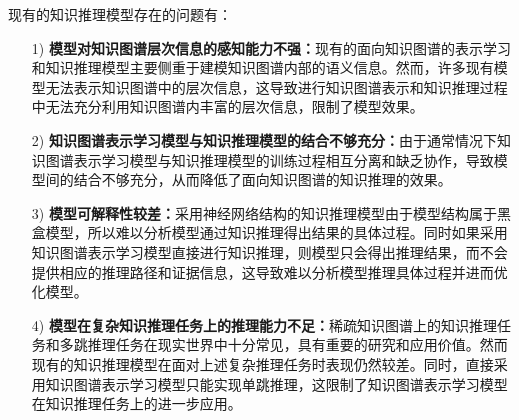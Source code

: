 \documentclass[algorithmlist, AutoFakeBold, AutoFakeSlant, figurelist, tablelist, nomlist, engineering]{seuthesix}
\begin{document}
现有的知识推理模型存在的问题有：
\begin{itemize}
  \item [1)]\textbf{模型对知识图谱层次信息的感知能力不强：}现有的面向知识图谱的表示学习和知识推理模型主要侧重于建模知识图谱内部的语义信息。然而，许多现有模型无法表示知识图谱中的层次信息，这导致进行知识图谱表示和知识推理过程中无法充分利用知识图谱内丰富的层次信息，限制了模型效果。
  \item [2)]\textbf{知识图谱表示学习模型与知识推理模型的结合不够充分：}由于通常情况下知识图谱表示学习模型与知识推理模型的训练过程相互分离和缺乏协作，导致模型间的结合不够充分，从而降低了面向知识图谱的知识推理的效果。
  \item [3)]\textbf{模型可解释性较差：}采用神经网络结构的知识推理模型由于模型结构属于黑盒模型，所以难以分析模型通过知识推理得出结果的具体过程。同时如果采用知识图谱表示学习模型直接进行知识推理，则模型只会得出推理结果，而不会提供相应的推理路径和证据信息，这导致难以分析模型推理具体过程并进而优化模型。
  \item [4)]\textbf{模型在复杂知识推理任务上的推理能力不足：}稀疏知识图谱上的知识推理任务和多跳推理任务在现实世界中十分常见，具有重要的研究和应用价值。然而现有的知识推理模型在面对上述复杂推理任务时表现仍然较差。同时，直接采用知识图谱表示学习模型只能实现单跳推理，这限制了知识图谱表示学习模型在知识推理任务上的进一步应用。
\end{itemize}
\end{document}
